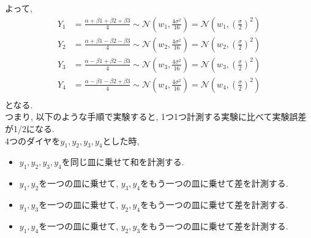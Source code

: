 \documentclass[uplatex]{jsarticle}
\begin{document}
    よって,
    \begin{align*}
        Y_1 &= \frac{\alpha + \beta1 + \beta2 + \beta3}{4} \sim \mathcal{N}(w_1, \frac{4\sigma^2}{16}) = \mathcal{N}(w_1, (\frac{\sigma}{2})^2) \\
        Y_2 &= \frac{\alpha + \beta1 - \beta2 - \beta3}{4} \sim \mathcal{N}(w_2, \frac{4\sigma^2}{16}) = \mathcal{N}(w_2, (\frac{\sigma}{2})^2) \\
        Y_3 &= \frac{\alpha - \beta1 + \beta2 - \beta3}{4} \sim \mathcal{N}(w_3, \frac{4\sigma^2}{16}) = \mathcal{N}(w_3, (\frac{\sigma}{2})^2) \\
        Y_4 &= \frac{\alpha - \beta1 - \beta2 + \beta3}{4} \sim \mathcal{N}(w_4, \frac{4\sigma^2}{16}) = \mathcal{N}(w_4, (\frac{\sigma}{2})^2) \\
    \end{align*}
    となる. \\
    つまり, 以下のような手順で実験すると, 1つ1つ計測する実験に比べて実験誤差が1/2になる. \\
    4つのダイヤを$y_1, y_2, y_3, y_4$とした時, 
    \begin{itemize}
        \item $y_1, y_2, y_3, y_4$を同じ皿に乗せて和を計測する.
        \item $y_1, y_2$を一つの皿に乗せて, $y_3, y_4$をもう一つの皿に乗せて差を計測する.
        \item $y_1, y_3$を一つの皿に乗せて, $y_2, y_4$をもう一つの皿に乗せて差を計測する.
        \item $y_1, y_4$を一つの皿に乗せて, $y_2, y_3$をもう一つの皿に乗せて差を計測する.
    \end{itemize}
\end{document}
